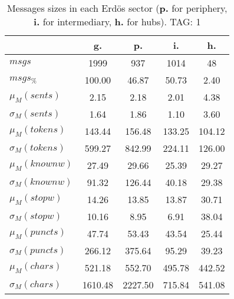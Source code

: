 \begin{table}[h!]
\begin{center}
\begin{tabular}{| l || c | c | c | c |}\hline
 & {\bf g.} & {\bf p.} & {\bf i.} & {\bf h.} \\\hline\hline
$msgs$ & 1999  & 937  & 1014  & 48 \\
$msgs_{\%}$ & 100.00  & 46.87  & 50.73  & 2.40 \\\hline
$\mu_M(sents)$ & 2.15  & 2.18  & 2.01  & 4.38 \\
$\sigma_M(sents)$ & 1.64  & 1.86  & 1.10  & 3.60 \\\hline
$\mu_M(tokens)$ & 143.44  & 156.48  & 133.25  & 104.12 \\
$\sigma_M(tokens)$ & 599.27  & 842.99  & 224.11  & 126.00 \\\hline
$\mu_M(knownw)$ & 27.49  & 29.66  & 25.39  & 29.27 \\
$\sigma_M(knownw)$ & 91.32  & 126.44  & 40.18  & 29.38 \\\hline
$\mu_M(stopw)$ & 14.26  & 13.85  & 13.87  & 30.71 \\
$\sigma_M(stopw)$ & 10.16  & 8.95  & 6.91  & 38.04 \\\hline
$\mu_M(puncts)$ & 47.74  & 53.43  & 43.54  & 25.44 \\
$\sigma_M(puncts)$ & 266.12  & 375.64  & 95.29  & 39.23 \\\hline
$\mu_M(chars)$ & 521.18  & 552.70  & 495.78  & 442.52 \\
$\sigma_M(chars)$ & 1610.48  & 2227.50  & 715.84  & 541.08 \\\hline
\end{tabular}
\caption{Messages sizes in each Erd\"os sector ({{\bf p.}} for periphery, {{\bf i.}} for intermediary, {{\bf h.}} for hubs). TAG: 1}
\end{center}
\end{table}